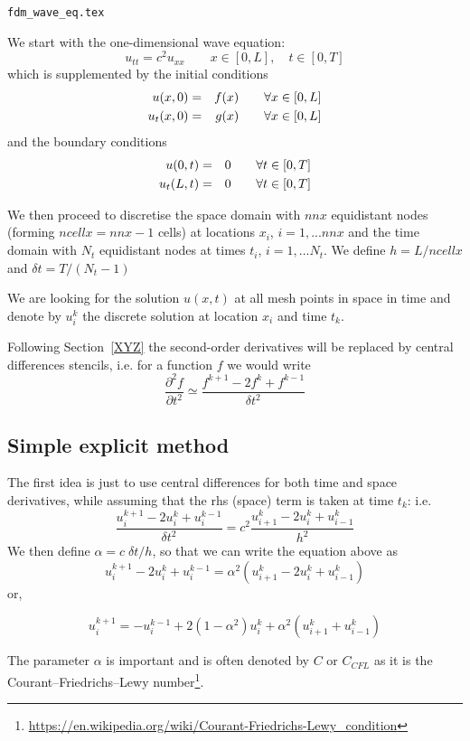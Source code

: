 
\begin{flushright} {\tiny {\color{gray} \tt fdm\_wave\_eq.tex}} \end{flushright}

We start with the one-dimensional wave equation:
\[
u_{tt}=c^2 u_{xx}  \qquad x\in[0,L], \quad t\in[0,T]
\]
which is supplemented by the initial conditions
\begin{eqnarray}
u(x,0) &=& f(x) \qquad  \forall x\in[0,L] \nonumber\\
u_t(x,0) &=& g(x) \qquad  \forall x\in[0,L] 
\end{eqnarray}
and the boundary conditions
\begin{eqnarray}
u(0,t) &=& 0 \qquad  \forall t \in [0,T] \nonumber\\
u_t(L,t) &=& 0 \qquad  \forall t\in[0,T] \label{eq:fdm_wave_bc}
\end{eqnarray}


We then proceed to discretise the space domain with $nnx$ equidistant nodes (forming $ncellx=nnx-1$ cells)
at locations $x_i$, $i=1,...nnx$ and the time domain with $N_t$ equidistant nodes at times
$t_i$, $i=1,...N_t$.
We define $h=L/ncellx$ and $\delta\! t=T/(N_t-1)$

We are looking for the solution $u(x,t)$ at all mesh points in space in time and denote by 
$u_i^k$ the discrete solution at location $x_i$ and time $t_k$.

Following Section~\ref{XYZ} the second-order derivatives will be replaced by central differences 
stencils, i.e. for a function $f$ we would write
\[
\frac{\partial^2  f}{\partial t^2} \simeq \frac{ f^{k+1} -2f^{k} +f^{k-1}  }{\delta\! t^2}
\]

\subsection{Simple explicit method}
\label{ss:fdmwavess}

The first idea is just to use central differences for both time and space derivatives,
while assuming that the rhs (space) term is taken at time $t_k$:
i.e.
\[
\frac{ u_i^{k+1} -2u_i^{k} +u_i^{k-1}  }{\delta\! t^2} = 
c^2
\frac{ u_{i+1}^k -2u_{i}^k +u_{i-1}^k  }{h^2} 
\]
We then define $\alpha = c\; \delta\! t / h$, so that we can write the equation above as
\begin{equation}
u_i^{k+1} -2u_i^{k} +u_i^{k-1}  = \alpha^2 (u_{i+1}^k -2u_{i}^k +u_{i-1}^k )
\label{eq:fdmwave1}
\end{equation}
or,
\begin{mdframed}[backgroundcolor=blue!5]
\begin{equation}
u_i^{k+1} = - u_i^{k-1} +2(1-\alpha^2) u_{i}^k + \alpha^2 (u_{i+1}^k +u_{i-1}^k ) 
\label{eq:wavee3}
\end{equation}
\end{mdframed}
The parameter $\alpha$ is important and is often denoted by $C$ or $C_{CFL}$ as it is the 
Courant–Friedrichs–Lewy number\footnote{\url{https://en.wikipedia.org/wiki/Courant-Friedrichs-Lewy_condition}}.

